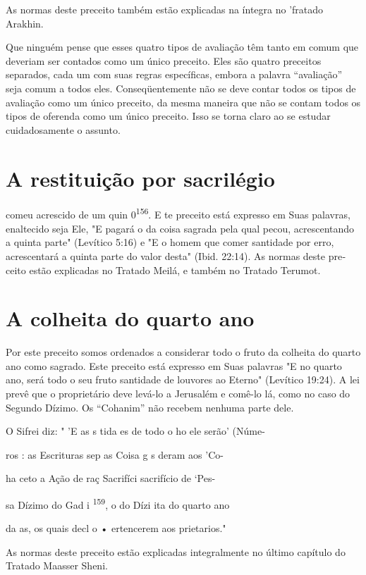 As normas deste preceito também estão explicadas na íntegra no 'fra­tado
Arakhin.

Que ninguém pense que esses quatro tipos de avaliação têm tanto em comum
que deveriam ser contados como um único preceito. Eles são qua­tro
preceitos separados, cada um com suas regras específicas, embora a
palavra ``avaliação'' seja comum a todos eles. Conseqüentemente não se
deve contar todos os tipos de avaliação como um único preceito, da mesma
maneira que não se contam todos os tipos de oferenda como um único
preceito. Isso se tor­na claro ao se estudar cuidadosamente o assunto.

\section{A restituição por sacrilégio}



comeu acrescido de um quin 0\textsuperscript{156}. E te preceito está
expresso em Suas palavras, enaltecido seja Ele, "E pagará o da coisa
sagrada pela qual pecou, acrescen­tando a quinta parte" (Levítico 5:16)
e "E o homem que comer santidade por er­ro, acrescentará a quinta parte
do valor desta" (Ibid. 22:14). As normas deste pre­ceito estão
explicadas no Tratado Meilá, e também no Tratado Terumot.

\section{A colheita do quarto ano}

Por este preceito somos ordenados a considerar todo o fruto da co­lheita
do quarto ano como sagrado. Este preceito está expresso em Suas
pala­vras "E no quarto ano, será todo o seu fruto santidade de louvores
ao Eterno" (Levítico 19:24). A lei prevê que o proprietário deve levá-lo
a Jerusalém e comê-lo lá, como no caso do Segundo Dízimo. Os ``Cohanim''
não recebem nenhuma parte dele.

O Sifrei diz: " 'E as s tida es de todo o ho ele serão' (Núme-

ros : as Escrituras sep as Coisa g s deram aos 'Co-

ha ceto a Ação de raç Sacrifíci sacrifício de `Pes-

sa Dízimo do Gad i \textsuperscript{159}, o do Dízi ita do quarto ano

da as, os quais decl o • ertencerem aos prietarios."

As normas deste preceito estão explicadas integralmente no último
capítulo do Tratado Maasser Sheni.

